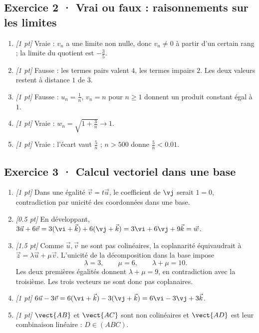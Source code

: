 \subsection*{Exercice 2 · Vrai ou faux : raisonnements sur les limites}\begin{enumerate}

\item \textit{[1 pt]} Vraie : $v_n$ a une limite non nulle, donc $v_n\ne0$ à partir d'un certain rang ; la limite du quotient est $-\frac{3}{5}$.

\item \textit{[1 pt]} Fausse : les termes pairs valent $4$, les termes impairs $2$. Les deux valeurs restent à distance $1$ de $3$.

\item \textit{[1 pt]} Fausse : $u_n=\frac{1}{n}$, $v_n=n$ pour $n\ge1$ donnent un produit constant égal à $1$.

\item \textit{[1 pt]} Vraie : $w_n=\sqrt{1+\frac{3}{n}}\to1$.

\item \textit{[1 pt]} Vraie : l'écart vaut $\frac{5}{n}$ ; $n>500$ donne $\frac{5}{n}<\num{0,01}$.

\end{enumerate}

\subsection*{Exercice 3 · Calcul vectoriel dans une base}\begin{enumerate}

\item \textit{[1 pt]} Dans une égalité $\vec v=t\vec u$, le coefficient de $\vj $ serait $1=0$, contradiction par unicité des coordonnées dans une base.

\item \textit{[\num{0,5} pt]} En développant, $3\vec u+6\vec v=3(\vi +\vec k)+6(\vj +\vec k)=3\vi +6\vj +9\vec k=\vec w$.

\item \textit{[\num{1,5} pt]} Comme $\vec u,\vec v$ ne sont pas colinéaires, la coplanarité équivaudrait à $\vec z=\lambda\vec u+\mu\vec v$. L'unicité de la décomposition dans la base impose
\[\lambda=3,\qquad\mu=6,\qquad\lambda+\mu=10.\]
Les deux premières égalités donnent $\lambda+\mu=9$, en contradiction avec la troisième. Les trois vecteurs ne sont donc pas coplanaires.

\item \textit{[1 pt]} $6\vec u-3\vec v=6(\vi +\vec k)-3(\vj +\vec k)=6\vi -3\vj +3\vec k$.

\item \textit{[1 pt]} $\vect{AB}$ et $\vect{AC}$ sont non colinéaires et $\vect{AD}$ est leur combinaison linéaire : $D\in(ABC)$.

\end{enumerate}

